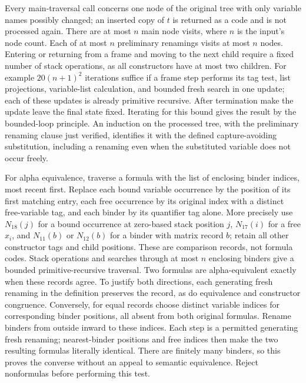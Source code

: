 Every main-traversal call concerns one node of the original tree with only
variable names possibly changed; an inserted copy of \(t\) is returned
as a code and is not processed again.  There are at most \(n\) main node
visits, where \(n\) is the input's node count.  Each of at most \(n\)
preliminary renamings visits at most \(n\) nodes.  Entering or returning
from a frame and moving to the next child require a fixed number of stack
operations, as all constructors have at most two children.  For example
\(20(n+1)^2\) iterations suffice if a frame step performs its tag test,
list projections, variable-list calculation, and bounded fresh search in
one update; each of these updates is already primitive recursive.
After termination make the update leave the final state fixed.  Iterating
for this bound gives the result by the bounded-loop principle.  An induction
on the processed tree, with the preliminary renaming clause just verified,
identifies it with the defined capture-avoiding substitution, including a
renaming even when the substituted variable does not occur freely.

For alpha equivalence, traverse a formula with the list of enclosing binder
indices, most recent first.  Replace each bound variable occurrence by the
position of its first matching entry, each free occurrence by its original
index with a distinct free-variable tag, and each binder by its quantifier
tag alone.  More precisely use \(N_{18}(j)\) for a bound occurrence at
zero-based stack position \(j\), \(N_{17}(i)\) for a free \(x_i\),
and \(N_{11}(b)\) or \(N_{12}(b)\) for a binder with matrix record
\(b\); retain all other constructor tags and child positions.
These are comparison records, not formula codes.  Stack operations and searches
through at most \(n\) enclosing binders give a bounded primitive-recursive
traversal.  Two formulas are alpha-equivalent exactly when these records
agree.  To justify both directions, each generating fresh renaming in the
definition preserves the record, as do equivalence and constructor
congruence.  Conversely, for equal records choose distinct variable indices
for corresponding binder positions, all absent from both original formulas.
Rename binders from outside inward to these indices.  Each step is a
permitted generating fresh renaming; nearest-binder positions and free
indices then make the two resulting formulas literally identical.  There
are finitely many binders, so this proves the converse without an appeal
to semantic equivalence.  Reject nonformulas before performing this test.

